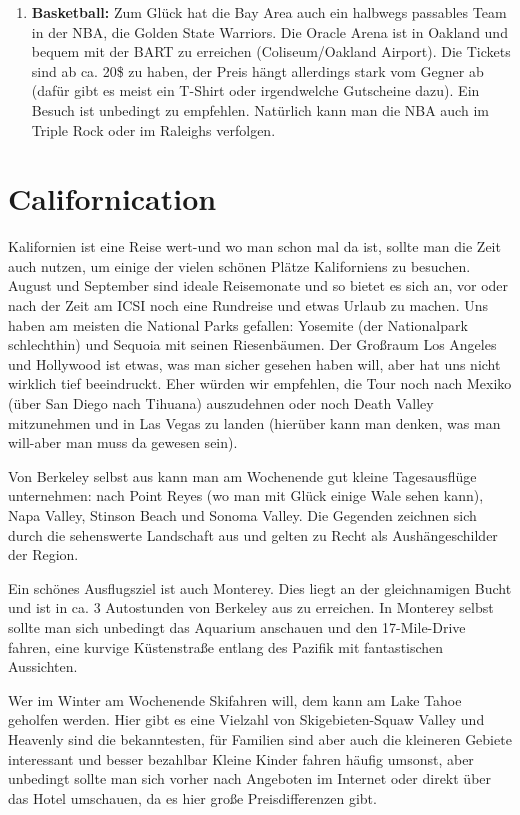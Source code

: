 \documentclass[a4paper]{scrreprt}
\begin{document}
\begin{enumerate}
	\item \textbf{Basketball:} Zum Glück hat die Bay Area auch ein halbwegs passables Team in der NBA, die Golden State Warriors. Die Oracle Arena ist in Oakland und bequem mit der BART zu erreichen (Coliseum/Oakland Airport). Die Tickets sind ab ca. 20\$ zu haben, der Preis hängt allerdings stark vom Gegner ab (dafür gibt es meist ein T-Shirt oder irgendwelche Gutscheine dazu). Ein Besuch ist unbedingt zu empfehlen. Natürlich kann man die NBA auch im Triple Rock oder im Raleighs verfolgen.

\end{enumerate}

\section{Californication}

Kalifornien ist eine Reise wert-und wo man schon mal da ist, sollte man die Zeit auch nutzen, um einige der vielen schönen Plätze Kaliforniens zu besuchen. August und September sind ideale Reisemonate und so bietet es sich an, vor oder nach der Zeit am ICSI noch eine Rundreise und etwas Urlaub zu machen. Uns haben am meisten die National Parks gefallen: Yosemite (der Nationalpark schlechthin) und Sequoia mit seinen Riesenbäumen. Der Großraum Los Angeles und Hollywood ist etwas, was man sicher gesehen haben will, aber hat uns nicht wirklich tief beeindruckt. Eher würden wir empfehlen, die Tour noch nach Mexiko (über San Diego nach Tihuana) auszudehnen oder noch Death Valley mitzunehmen und in Las Vegas zu landen (hierüber kann man denken, was man will-aber man muss da gewesen sein).

Von Berkeley selbst aus kann man am Wochenende gut kleine Tagesausflüge unternehmen: nach Point Reyes (wo man mit Glück einige Wale sehen kann), Napa Valley, Stinson Beach und Sonoma Valley. Die Gegenden zeichnen sich durch die sehenswerte Landschaft aus und gelten zu Recht als Aushängeschilder der Region.

Ein schönes Ausflugsziel ist auch Monterey. Dies liegt an der gleichnamigen Bucht und ist in ca. 3 Autostunden von Berkeley aus zu erreichen. In Monterey selbst sollte man sich unbedingt das Aquarium anschauen und den 17-Mile-Drive fahren, eine kurvige Küstenstraße entlang des Pazifik mit fantastischen Aussichten.

Wer im Winter am Wochenende Skifahren will, dem kann am Lake Tahoe geholfen werden. Hier gibt es eine Vielzahl von Skigebieten-Squaw Valley und Heavenly sind die bekanntesten, für Familien sind aber auch die kleineren Gebiete interessant und besser bezahlbar Kleine Kinder fahren häufig umsonst, aber unbedingt sollte man sich vorher nach Angeboten im Internet oder direkt über das Hotel umschauen, da es hier große Preisdifferenzen gibt.
\end{document}
